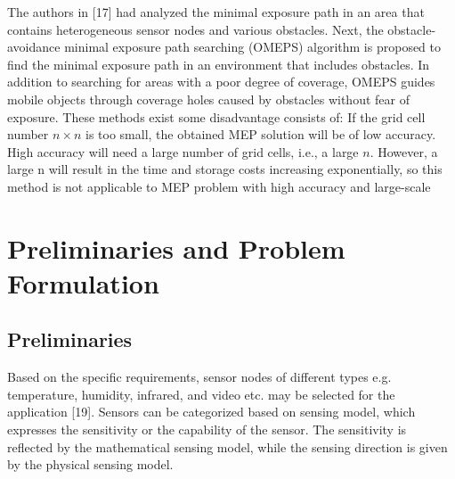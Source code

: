 \documentclass[final]{elsarticle}
\begin{document}
The authors in [17] had analyzed the minimal exposure path in an area that contains heterogeneous sensor nodes and various obstacles. Next, the obstacle-avoidance minimal exposure path searching (OMEPS) algorithm is proposed to find the minimal exposure path in an environment that includes obstacles. In addition to searching for areas with a poor degree of coverage, OMEPS guides mobile objects through coverage holes caused by obstacles without fear of exposure.
These methods exist some disadvantage consists of: If the grid cell number $ n \times n $ is too small, the obtained MEP solution will be of low accuracy. High accuracy will need a large number of grid cells, i.e., a large $ n $. However, a large n will result in the time and storage costs increasing exponentially, so this method is not applicable to MEP problem with high accuracy and large-scale 

\section{Preliminaries and Problem Formulation}
\subsection{ Preliminaries}
	
Based on the specific requirements, sensor nodes of different types e.g. temperature, humidity, infrared, and video etc. may be selected for the application [19]. Sensors can be categorized based on sensing model, which expresses the sensitivity or the capability of the sensor. The sensitivity is reflected by the mathematical sensing model, while the sensing direction is given by the physical sensing model.
\end{document}

